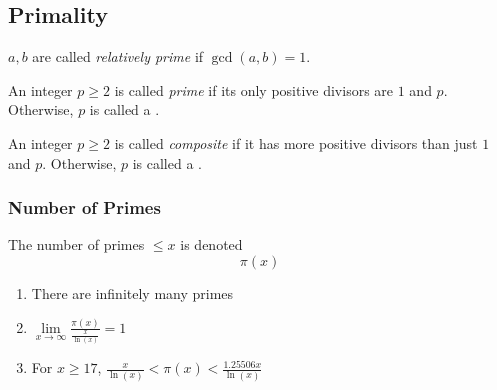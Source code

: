 \subsection{Primality}\label{subsec:Primality}
\begin{definition}\label{def:Relatively_Prime}
  $a, b$ are called \emph{relatively prime} if $\gcd(a, b) = 1$.
\end{definition}

\begin{definition}[Prime]\label{def:Prime}
  An integer $p \geq 2$ is called \emph{prime} if its only positive divisors are $1$ and $p$.
  Otherwise, $p$ is called a \emph{}.
\end{definition}

\begin{definition}[Composite]\label{def:Composite}
  An integer $p \geq 2$ is called \emph{composite} if it has more positive divisors than just $1$ and $p$.
  Otherwise, $p$ is called a \emph{}.
\end{definition}

\subsubsection{Number of Primes}\label{subsubsec:Number_of_Primes}
The number of primes $\leq x$ is denoted
\begin{equation}\label{eq:Number_of_Primes}
  \pi(x)
\end{equation}
\begin{enumerate}[noitemsep]
\item There are infinitely many primes
\item $\lim\limits_{x \rightarrow \infty} \frac{\pi(x)}{\frac{x}{\ln(x)}} = 1$
\item For $x \geq 17$, $\frac{x}{\ln(x)} < \pi(x) < \frac{1.25506x}{\ln(x)}$
\end{enumerate}

